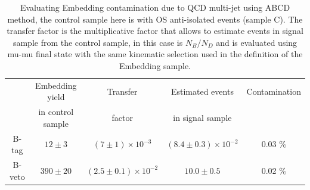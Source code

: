\begin{table} [tp]
\begin{small}
\centering
\begin{tabular}{c c c c c}
\hline
\hline
 & Embedding yield	& Transfer	& Estimated events	& Contamination \\
 & in control sample	& factor	& in signal sample	&	\\		 [0.5ex]
\hline
B-tag  & $12 \pm 3$ & $ (7 \pm 1) \times 10^{-3}$ &  $(8.4 \pm 0.3) \times 10^{-2}$ &  0.03 \% \\
B-veto & $390 \pm 20$ & $(2.5 \pm 0.1) \times 10^{-2}$ & $10.0 \pm 0.5$ & 0.02 \% \\[1ex]
\hline
\end{tabular}
\end{small}
\caption{Evaluating Embedding contamination due to QCD multi-jet using ABCD method, 
the control sample here is with OS anti-isolated events (sample C). The transfer factor is the
multiplicative factor that allows to estimate events in signal sample from the control sample, in this case is $N_{B} / N_{D}$
and is evaluated using mu-mu final state with the same kinematic selection used in the 
definition of the Embedding sample. }
\label{table:emb_cont_qcd}
\end{table}



